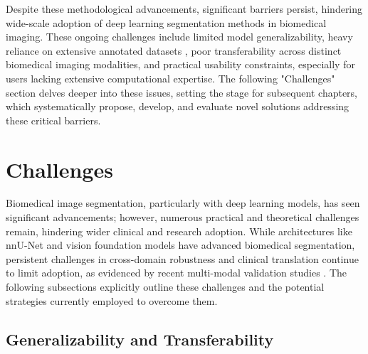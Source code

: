 \documentclass[./dissertation.tex]{subfiles}
\begin{document}


Despite these methodological advancements, significant barriers persist, hindering wide-scale adoption of deep learning segmentation methods in biomedical imaging. These ongoing challenges include limited model generalizability, heavy reliance on extensive annotated datasets \cite{wang2021annotation}, poor transferability across distinct biomedical imaging modalities, and practical usability constraints, especially for users lacking extensive computational expertise. The following "Challenges" section delves deeper into these issues, setting the stage for subsequent chapters, which systematically propose, develop, and evaluate novel solutions addressing these critical barriers.

\section{Challenges}
Biomedical image segmentation, particularly with deep learning models, has seen significant advancements; however, numerous practical and theoretical challenges remain, hindering wider clinical and research adoption. While architectures like nnU-Net and vision foundation models have advanced biomedical segmentation, persistent challenges in cross-domain robustness and clinical translation continue to limit adoption, as evidenced by recent multi-modal validation studies \cite{isensee2024nnu}. The following subsections explicitly outline these challenges and the potential strategies currently employed to overcome them.

\subsection{Generalizability and Transferability}
\end{document}
